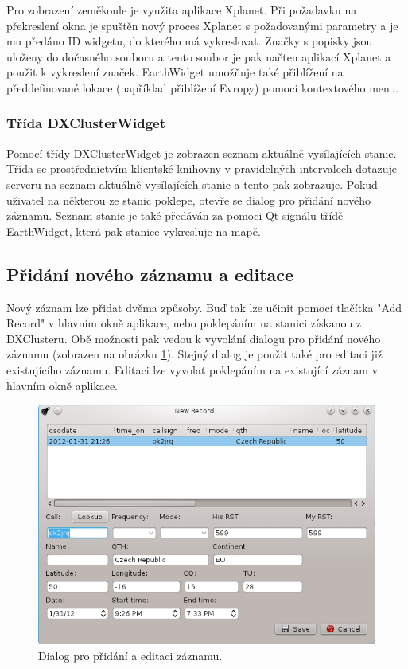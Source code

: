 Pro zobrazení zeměkoule je využita aplikace Xplanet. Při požadavku na překreslení okna je spuštěn nový proces Xplanet
s požadovanými parametry a je mu předáno ID widgetu, do kterého má vykreslovat. Značky s popisky jsou uloženy do dočasného souboru
a tento soubor je pak načten aplikací Xplanet a použit k vykreslení značek.
EarthWidget umožňuje také přiblížení na předdefinované lokace (například přiblížení Evropy) pomocí kontextového menu.

\subsubsection{Třída DXClusterWidget}

Pomocí třídy DXClusterWidget je zobrazen seznam aktuálně vysílajících stanic. Třída se prostřednictvím klientské knihovny
v pravidelných intervalech dotazuje
serveru na seznam aktuálně vysílajících stanic a tento pak zobrazuje. Pokud uživatel na některou ze stanic poklepe, otevře se 
dialog pro přidání nového záznamu. Seznam stanic je také předáván za pomoci Qt signálu třídě EarthWidget, která pak stanice
vykresluje na mapě.

\subsection{Přidání nového záznamu a editace}

Nový záznam lze přidat dvěma způsoby. Buď tak lze učinit pomocí tlačítka "Add Record" v hlavním okně aplikace, nebo poklepáním
na stanici získanou z DXClusteru. Obě možnosti pak vedou k vyvolání dialogu pro přidání nového záznamu
(zobrazen na obrázku \ref{fig:novy_zaznam}). Stejný dialog je použit
také pro editaci již existujícího záznamu. Editaci lze vyvolat poklepáním na existující záznam v hlavním okně aplikace.

\begin{figure}[h]
\centering
\includegraphics[trim=0cm 0cm 0cm 0cm, scale=0.9]{fig/ham4}
\caption{Dialog pro přidání a editaci záznamu.}
\label{fig:novy_zaznam}
\end{figure}

